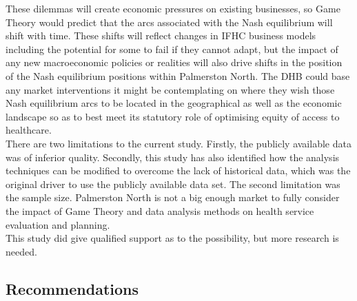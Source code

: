 \documentclass[11pt,a4paper]{article}
\begin{document}
These dilemmas will create economic pressures on existing businesses, so Game Theory would predict that the arcs associated with the Nash equilibrium will shift with time. These shifts will reflect changes in IFHC business models including the potential for some to fail if they cannot adapt, but the impact of any new macroeconomic policies or realities will also drive shifts in the position of the Nash equilibrium positions within Palmerston North. The DHB could base any market interventions it might be contemplating on where they wish those Nash equilibrium arcs to be located in the geographical as well as the economic landscape so as to best meet its statutory role of optimising equity of access to healthcare.\\


There are two limitations to the current study. Firstly, the publicly available data was of inferior quality. Secondly, this study has also identified how the analysis techniques can be modified to overcome the lack of historical data, which was the original driver to use the publicly available data set. The second limitation was the sample size. Palmerston North is not a big enough market to fully consider the impact of Game Theory and data analysis methods on health service evaluation and planning.\\


This study did give qualified support as to the possibility, but more research is needed.\\


\subsection{Recommendations}
 
\end{document}
